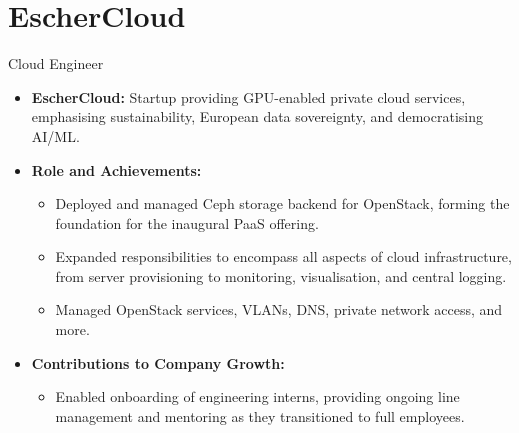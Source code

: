 \documentclass[10pt]{beamer}
\begin{document}
  \section{EscherCloud}
  \begin{frame}{Cloud Engineer}
    \begin{itemize}
      \item \textbf{EscherCloud:} Startup providing GPU-enabled
      private cloud services, emphasising sustainability, European data sovereignty,
      and democratising AI/ML.
  
      \item \textbf{Role and Achievements:}
        \begin{itemize}
          \item Deployed and managed Ceph storage backend for OpenStack, forming
          the foundation for the inaugural PaaS offering.
          \item Expanded responsibilities to encompass all aspects of cloud
          infrastructure, from server provisioning to monitoring, visualisation,
          and central logging.
          \item Managed OpenStack services, VLANs, DNS, private network access,
          and more.
        \end{itemize}
  
      \item \textbf{Contributions to Company Growth:}
        \begin{itemize}
          \item Enabled onboarding of engineering interns, providing ongoing
          line management and mentoring as they transitioned to full employees.
        \end{itemize}
    \end{itemize}
  \end{frame}
\end{document}
